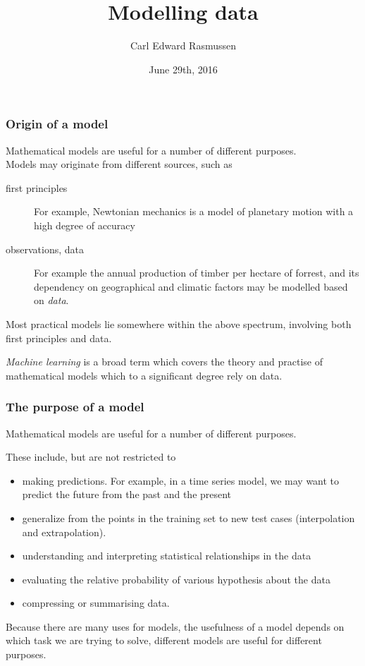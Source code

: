 

\title{Modelling data}
\author{Carl Edward Rasmussen}
\date{June 29th, 2016}



\begin{frame}
\titlepage
\end{frame}

\begin{frame}
\frametitle{Origin of a model}

Mathematical models are useful for a number of different purposes.\\

Models may originate from different sources, such as
\begin{description}
\item[first principles] For example, Newtonian mechanics is a model of planetary motion with a high degree of accuracy
\item[observations, data] For example the annual production of timber per hectare of forrest, and its dependency on geographical and climatic factors may be modelled based on \emph{data}.
\end{description}
Most practical models lie somewhere within the  above spectrum, involving both first principles and data.

\emph{Machine learning} is a broad term which covers the theory and practise of mathematical models which to a significant degree rely on data.  
\end{frame}


\begin{frame}
\frametitle{The purpose of a model}

Mathematical models are useful for a number of different purposes.

These include, but are not restricted to
\begin{itemize}
\item making predictions. For example, in a time series model, we may want to predict the future from the past and the present
\item generalize from the points in the training set to new test cases (interpolation and extrapolation).
\item understanding and interpreting statistical relationships in the data
\item evaluating the relative probability of various hypothesis about the data
\item compressing or summarising data.
\end{itemize}

Because there are many uses for models, the usefulness of a model depends on which task we are trying to solve, different models are useful for different purposes.
\end{frame}




